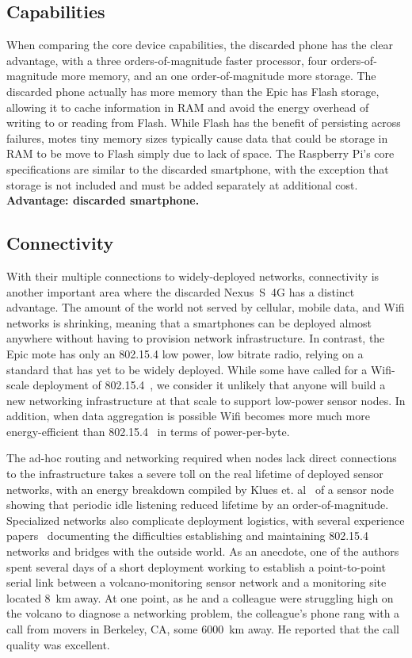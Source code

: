 \subsection{Capabilities}

When comparing the core device capabilities, the discarded phone has the
clear advantage, with a three orders-of-magnitude faster processor, four
orders-of-magnitude more memory, and an one order-of-magnitude more storage.
The discarded phone actually has more memory than the Epic has Flash storage,
allowing it to cache information in RAM and avoid the energy overhead of
writing to or reading from Flash. While Flash has the benefit of persisting
across failures, motes tiny memory sizes typically cause data that could be
storage in RAM to be move to Flash simply due to lack of space. The Raspberry
Pi's core specifications are similar to the discarded smartphone, with the
exception that storage is not included and must be added separately at
additional cost. \textbf{Advantage: discarded smartphone.}

\subsection{Connectivity}

With their multiple connections to widely-deployed networks, connectivity is
another important area where the discarded Nexus~S~4G has a distinct
advantage. The amount of the world not served by cellular, mobile data, and
Wifi networks is shrinking, meaning that a smartphones can be deployed almost
anywhere without having to provision network infrastructure. In contrast, the
Epic mote has only an 802.15.4 low power, low bitrate radio, relying on a
standard that has yet to be widely deployed. While some have called for a
Wifi-scale deployment of 802.15.4~\cite{FIXME-leaves}, we consider it
unlikely that anyone will build a new networking infrastructure at that scale
to support low-power sensor nodes. In addition, when data aggregation is
possible Wifi becomes more much more energy-efficient than
802.15.4~\cite{wirelessenergyconsumption-url} in terms of power-per-byte.

The ad-hoc routing and networking required when nodes lack direct connections
to the infrastructure takes a severe toll on the real lifetime of deployed
sensor networks, with an energy breakdown compiled by Klues et.
al~\cite{icem-sosp07} of a sensor node showing that periodic idle listening
reduced lifetime by an order-of-magnitude. Specialized networks also
complicate deployment logistics, with several experience
papers~\cite{volcano-osdi06,FIXME-hitchhikers} documenting the difficulties
establishing and maintaining 802.15.4 networks and bridges with the outside
world. As an anecdote, one of the authors spent several days of a short
deployment working to establish a point-to-point serial link between a
volcano-monitoring sensor network and a monitoring site located 8~km away. At
one point, as he and a colleague were struggling high on the volcano to
diagnose a networking problem, the colleague's phone rang with a call from
movers in Berkeley, CA, some \num{6000}~km away. He reported that the call
quality was excellent.

